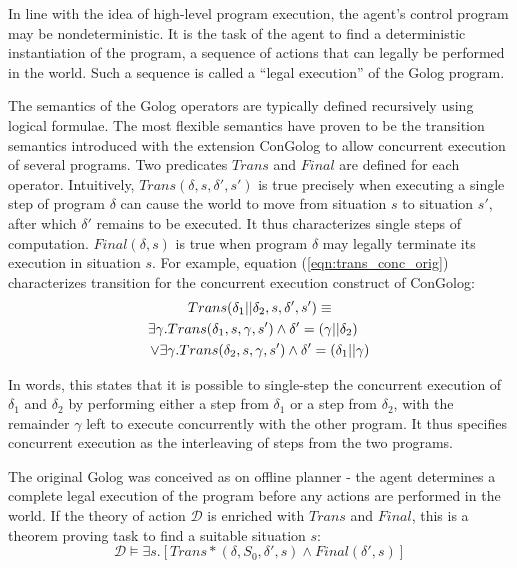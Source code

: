 \documentclass[letterpaper]{article}
\begin{document}
In line with the idea of high-level program execution, the agent's
control program may be nondeterministic. It is the task of the agent to
find a deterministic instantiation of the program, a sequence of actions
that can legally be performed in the world. Such a sequence is called a ``legal
execution'' of the Golog program.

The semantics of the Golog operators are typically defined recursively
using logical formulae. The most flexible semantics have proven to
be the transition semantics introduced with the extension ConGolog
\cite{giacomo00congolog} to allow concurrent execution of several
programs. Two predicates $Trans$ and $Final$ are defined for each
operator. Intuitively, $Trans(\delta,s,\delta',s')$ is true precisely
when executing a single step of program $\delta$ can cause the world
to move from situation $s$ to situation $s'$, after which $\delta'$
remains to be executed. It thus characterizes single steps of computation.
$Final(\delta,s)$ is true when program
$\delta$ may legally terminate its execution in situation $s$.  For example,
equation (\ref{eqn:trans_conc_orig}) characterizes transition for the 
concurrent execution construct of ConGolog:
\begin{multline}
\label{eqn:trans_conc_orig}
Trans(\delta_{1}||\delta_{2},s,\delta',s')\equiv\\
\shoveright{\exists\gamma. Trans(\delta_{1},s,\gamma,s')\wedge \delta'=(\gamma||\delta_2)}\\
\vee\exists\gamma. Trans(\delta_{2},s,\gamma,s')\wedge \delta'=(\delta_1 || \gamma)
\end{multline}

In words, this states that it is possible to single-step the concurrent
execution of $\delta_1$ and $\delta_2$ by performing either a step from
$\delta_1$ or a step from $\delta_2$, with the remainder $\gamma$ left
to execute
concurrently with the other program.
It thus specifies concurrent execution as the interleaving of steps from
the two programs.

The original Golog was conceived as on offline planner - the agent
determines a complete legal execution of the program before any actions
are performed in the world.  If the theory of action $\mathcal{D}$ is enriched
with $Trans$ and $Final$, this is a theorem proving task to find a suitable
situation $s$:
\begin{equation}
\label{eqn:golog_execution}
\mathcal{D}\models\exists s.\left[Trans*(\delta,S_{0},\delta',s)\wedge Final(\delta',s)\right]
\end{equation}
\end{document}
